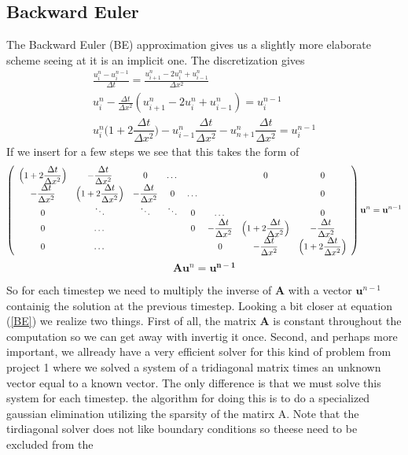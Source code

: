 \documentclass[a4paper,english, 10pt, twoside]{article}
\begin{document}
\subsection{Backward Euler}
The Backward Euler (BE) approximation gives us a slightly more elaborate scheme seeing at it is an implicit one. The discretization 
gives
\begin{align*}
 \frac{u^{n}_i-u^{n-1}_i}{\Delta t} = \frac{u^n_{i+1}-2u^n_i + u^n_{i-1}}{\Delta x^2} \\
 u^n_i -\frac{\Delta t}{\Delta x^2}\left(u^n_{i+1}-2u^n_i + u^n_{i-1}\right) = u^{n-1}_i \\
 u^n_i\Big(1+2\dfrac{\Delta t}{\Delta x^2}\Big) -u^n_{i-1}\dfrac{\Delta t}{\Delta x^2} - u^n_{n+1}\dfrac{\Delta t}{\Delta x^2} 
 = u^{n-1}_i
\end{align*}
If we insert for a few steps we see that this takes the form of
\begin{align}\label{BE}
 \left(\begin{array}{c c c c c c c c}
        \Big(1+2\dfrac{\Delta t}{\Delta x^2}\Big) & -\dfrac{\Delta t}{\Delta x^2} &0 &\dots & & &0 &0 \\
        -\dfrac{\Delta t}{\Delta x^2} & \Big(1+2\dfrac{\Delta t}{\Delta x^2}\Big) & -\dfrac{\Delta t}{\Delta x^2} &0 &\dots & & &0 \\
        0& \ddots & \ddots & \ddots & 0 & \dots &  &0\\
        0& \dots & & &0&-\dfrac{\Delta t}{\Delta x^2} & \Big(1+2\dfrac{\Delta t}{\Delta x^2}\Big) & -\dfrac{\Delta t}{\Delta x^2}\\
         0& \dots & && &0&-\dfrac{\Delta t}{\Delta x^2} & \Big(1+2\dfrac{\Delta t}{\Delta x^2}\Big) 
       \end{array}\right)\mathbf{u}^n = \mathbf{u}^{n-1} 
\end{align}
\begin{equation*}
 \mathbf{A}\mathbf{u}^n = \mathbf{u^{n-1}}
\end{equation*}

So for each timestep we need to multiply the inverse of $\mathbf{A}$ with a vector $\mathbf{u}^{n-1}$ containig the solution at 
the previous timestep. Looking a bit closer at equation (\ref{BE}) we realize two things. First of all, the matrix 
$\mathbf{A}$ is constant throughout the computation so we can get away with invertig it once. Second, and perhaps 
more important, we allready have a very efficient solver for this kind of problem from project 1 where we solved a system of a tridiagonal matrix
times an unknown vector equal to a known vector. The only difference is that we must solve this system for each timestep. the algorithm for 
doing this is to do a specialized gaussian elimination utilizing the sparsity of the matirx A. Note that the tirdiagonal solver does not 
like boundary conditions so theese need to be excluded from the \\
\end{document}
